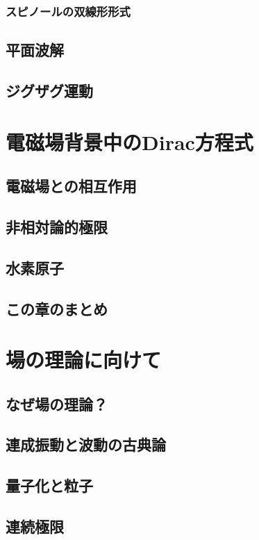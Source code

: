 \documentclass[report,paper=a4, fontsize=12pt, line_length=16cm, number_of_lines=33,dvipdfmx]{jlreq}
\numberwithin{equation}{chapter}
\begin{document}
\subsection{スピノールの双線形形式}


\section{平面波解}




\section{ジグザグ運動}



\chapter{電磁場背景中のDirac方程式}
\section{電磁場との相互作用}
\section{非相対論的極限}
\section{水素原子}
\section{この章のまとめ}



\chapter{場の理論に向けて}
\section{なぜ場の理論？}
\section{連成振動と波動の古典論}
\section{量子化と粒子}
\section{連続極限}
\end{document}
